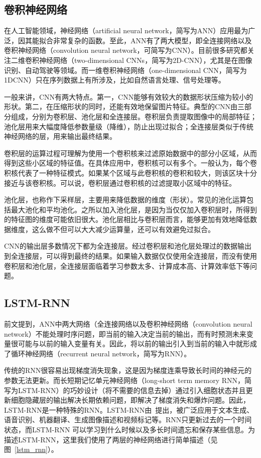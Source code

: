 \subsection{卷积神经网络}\label{sec:卷积神经网络}

在人工智能领域，神经网络（artificial neural network，简写为ANN）应用最为广泛，因其能拟合非常复杂的函数。至此，ANN有了两大模型，即全连接网络以及卷积神经网络（convolution neural network，可简写为CNN）。目前很多研究都关注二维卷积神经网络（two-dimensional CNNs，简写为2D-CNN），尤其是在图像识别、自动驾驶等领域。而一维卷积神经网络（one-dimensional CNN，简写为1DCNN）只在序列数据上有所涉及，比如自然语言处理、信号处理等。

一般来讲，CNN有两大特点。第一，CNN能够有效较大的数据形状压缩为较小的形状。第二，在压缩形状的同时，还能有效地保留图片特征。典型的CNN由三部分组成，分别为卷积层、池化层和全连接层。卷积层负责提取图像中的局部特征；池化层用来大幅度降低参数量级（降维），防止出现过拟合；全连接层类似于传统神经网络的层，用来输出最终结果。

卷积层的运算过程可理解为使用一个卷积核来过滤原始数据中的部分小区域，从而得到这些小区域的特征值。在具体应用中，卷积核可以有多个。一般认为，每个卷积核代表了一种特征模式。如果某个区域与此卷积核的卷积和较大，则该区块十分接近与该卷积核。可以说，卷积层通过卷积核的过滤提取小区域中的特征。

池化层，也称作下采样层，主要用来降低数据的维度（形状）。常见的池化运算包括最大池化和平均池化。之所以加入池化层，是因为当仅仅加入卷积层时，所得到的特征图的维度可能依旧很大。池化层相比与卷积层而言，能够更加有效地降低数据维度，这么做不但可以大大减少运算量，还可以有效避免过拟合。

CNN的输出层多数情况下都为全连接层。经过卷积层和池化层处理过的数据输出到全连接层，可以得到最终的结果。如果输入数据仅仅使用全连接层，而没有使用卷积层和池化层，全连接层面临着学习参数太多、计算成本高、计算效率低下等问题。


\subsection{LSTM-RNN}\label{sec:LSTM-RNN}

前文提到，ANN中两大网络（全连接网络以及卷积神经网络（convolution neural network）不能处理时序问题，即当前的输入决定当前的输出，而有时预测未来变量很可能与以前的输入变量有关。因此，将以前的输出引入到当前的输入中就形成了循环神经网络（recurrent neural network，简写为RNN）。

传统的RNN很容易出现梯度消失现象，这是因为梯度连乘导致长时间的神经元的参数无法更新。而长短期记忆单元神经网络（long-short term memory RNN，简写为LSTM-RNN）的巧妙设计（将不需要的信息去掉）通过引入细胞状态并且更新细胞隐藏层的输出解决长期依赖问题，即解决了梯度消失和爆炸问题。因此，LSTM-RNN是一种特殊的RNN。LSTM-RNN由~\citep{hochreiter1997long}提出，被广泛应用于文本生成、语音识别、机器翻译、生成图像描述和视频标记等。RNN只更新过去的一个时间状态，而LSTM-RNN 可以学习到什么时候以及多长时间遗忘和保存某些信息。为描述LSTM-RNN，这里我们使用了两层的神经网络进行简单描述（见图~\ref{lstm_rnn}）。

